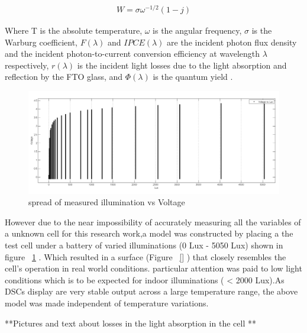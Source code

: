 {   \begin{equation}
     \begin{aligned}
     W = \sigma{\omega^{-1/2}}(1-\textit{j})
     \end{aligned}
    \end{equation}
    
Where T is the absolute temperature, $\omega$ is the angular frequency, $\sigma$ is the Warburg coefficient, $F(\lambda)$ and  $IPCE(\lambda)$ are the incident photon flux density and the incident photon-to-current conversion efficiency at wavelength $\lambda$ respectively, $r(\lambda)$ is the incident light losses due to the light absorption and reflection by the FTO glass, and $\Phi(\lambda)$ is the quantum yield \cite{yong2008modeling}.\newline

 \begin{figure}[H]
  \begin{center}
	\includegraphics[width=\linewidth]{images/Voltagevlux}
	\caption{spread of measured illumination vs Voltage  }
	\label{fig:Voltagevlux}
  \end{center}
 \end{figure}
 
However due to the near impossibility of accurately measuring all the variables of a unknown cell for this research work,a model was constructed by placing a the test cell under a battery of varied illuminations (0 Lux - 5050 Lux) shown in figure ~\ref{fig:Voltagevlux} . Which resulted in a surface (Figure ~\ref{} ) that closely resembles the cell's operation in real world conditions. particular attention was paid to low light conditions which is to be expected for indoor illuminations ( < 2000 Lux).As \ac{DSCs} display are very stable output across a large temperature range, the above model was made independent of temperature variations.   




**Pictures and text about losses in the light absorption in the cell **

}
